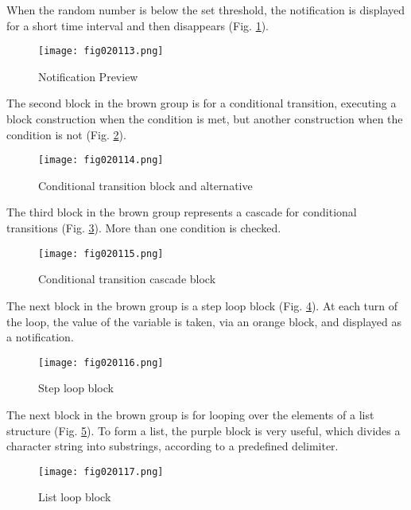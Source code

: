When the random number is below the set threshold, the notification is displayed for a short time interval and then disappears (Fig. \ref{fig020113}).

\begin{figure}[H]
   \centering
   \texttt{[image: fig020113.png]}
   \caption{Notification Preview}
\label{fig020113}
\end{figure}

The second block in the brown group is for a conditional transition, executing a block construction when the condition is met, but another construction when the condition is not (Fig. \ref{fig020114}).

\begin{figure}[H]
   \centering
   \texttt{[image: fig020114.png]}
   \caption{Conditional transition block and alternative}
\label{fig020114}
\end{figure}

The third block in the brown group represents a cascade for conditional transitions (Fig. \ref{fig020115}). More than one condition is checked.

\begin{figure}[H]
   \centering
   \texttt{[image: fig020115.png]}
   \caption{Conditional transition cascade block}
\label{fig020115}
\end{figure}

The next block in the brown group is a step loop block (Fig. \ref{fig020116}). At each turn of the loop, the value of the variable is taken, via an orange block, and displayed as a notification.

\begin{figure}[H]
   \centering
   \texttt{[image: fig020116.png]}
   \caption{Step loop block}
\label{fig020116}
\end{figure}

The next block in the brown group is for looping over the elements of a list structure (Fig. \ref{fig020117}). To form a list, the purple block is very useful, which divides a character string into substrings, according to a predefined delimiter.

\begin{figure}[H]
   \centering
   \texttt{[image: fig020117.png]}
   \caption{List loop block}
\label{fig020117}
\end{figure}

